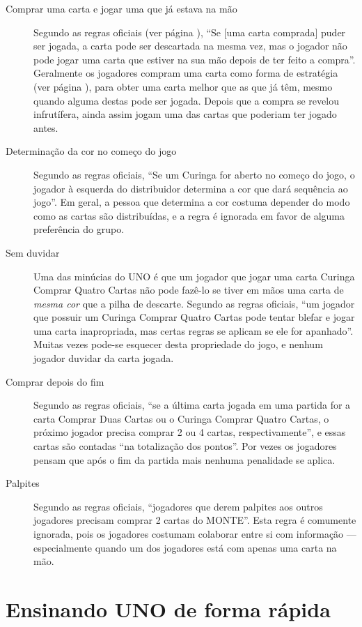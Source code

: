\begin{description}
\item[Comprar uma carta e jogar uma que já estava na mão]{Segundo as regras oficiais (ver página \pageref{oficiais}), ``Se [uma carta comprada] puder ser jogada, a carta pode ser descartada na mesma vez, mas o jogador não pode jogar uma carta que estiver na sua mão depois de ter feito a compra''. Geralmente os jogadores compram uma carta como forma de estratégia (ver página \pageref{consumismo}), para obter uma carta melhor que as que já têm, mesmo quando alguma destas pode ser jogada. Depois que a compra se revelou infrutífera, ainda assim jogam uma das cartas que poderiam ter jogado antes.}
\item[Determinação da cor no começo do jogo]{Segundo as regras oficiais, ``Se um Curinga for aberto no começo do jogo, o jogador à esquerda do distribuidor determina a cor que dará sequência ao jogo''. Em geral, a pessoa que determina a cor costuma depender do modo como as cartas são distribuídas, e a regra é ignorada em favor de alguma preferência do grupo.}
\item[Sem duvidar]{Uma das minúcias do UNO é que um jogador que jogar uma carta Curinga Comprar Quatro Cartas não pode fazê-lo se tiver em mãos uma carta de \emph{mesma cor} que a pilha de descarte. Segundo as regras oficiais, ``um jogador que possuir um Curinga Comprar Quatro Cartas pode tentar blefar e jogar uma carta inapropriada, mas certas regras se aplicam se ele for apanhado''. Muitas vezes pode-se esquecer desta propriedade do jogo, e nenhum jogador duvidar da carta jogada.}
\item[Comprar depois do fim]{Segundo as regras oficiais, ``se a última carta jogada em uma partida for a carta Comprar Duas Cartas ou o Curinga Comprar Quatro Cartas, o próximo jogador precisa comprar 2 ou 4 cartas, respectivamente'', e essas cartas são contadas ``na totalização dos pontos''. Por vezes os jogadores pensam que após o fim da partida mais nenhuma penalidade se aplica.}
\item[Palpites]{Segundo as regras oficiais, ``jogadores que derem palpites aos outros jogadores precisam comprar 2 cartas do MONTE''. Esta regra é comumente ignorada, pois os jogadores costumam colaborar entre si com informação --- especialmente quando um dos jogadores está com apenas uma carta na mão.}
\end{description}

\newpage

\section{Ensinando UNO de forma rápida}

